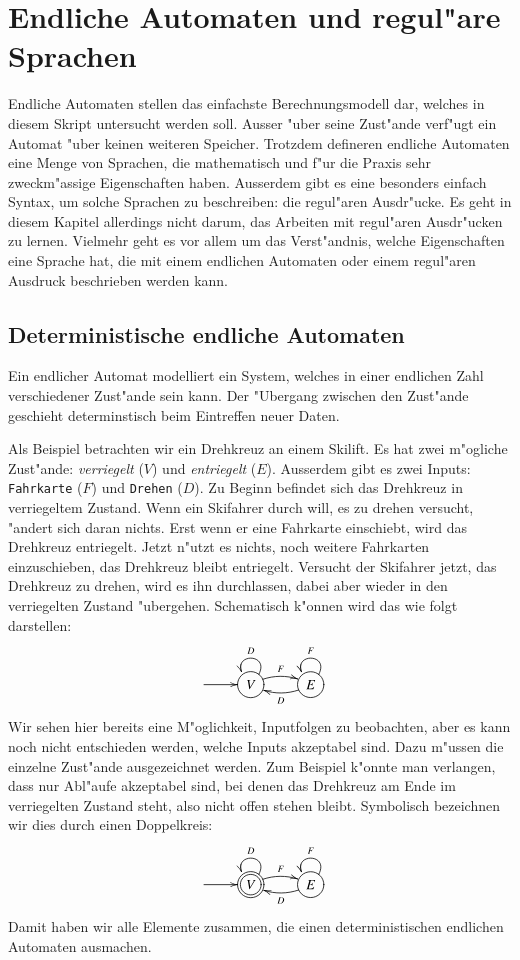 %
%
\chapter{Endliche Automaten und regul"are Sprachen\label{chapter-regular}}
Endliche Automaten stellen das einfachste Berechnungsmodell
dar, welches in diesem Skript untersucht werden soll. Ausser 
"uber seine Zust"ande verf"ugt ein Automat "uber keinen weiteren
Speicher.
Trotzdem defineren endliche Automaten eine Menge von Sprachen, die 
mathematisch und f"ur die Praxis sehr zweckm"assige Eigenschaften
haben.
Ausserdem gibt es eine besonders einfach Syntax, um
solche Sprachen zu beschreiben: die regul"aren Ausdr"ucke.
Es geht in diesem Kapitel allerdings nicht darum, das Arbeiten
mit regul"aren Ausdr"ucken zu lernen.
Vielmehr geht es vor allem um das Verst"andnis, welche Eigenschaften
eine Sprache hat, die mit einem endlichen Automaten oder einem
regul"aren Ausdruck beschrieben werden kann.

\section{Deterministische endliche Automaten}
Ein endlicher Automat modelliert ein System, welches
in einer endlichen Zahl verschiedener Zust"ande sein kann. Der
"Ubergang zwischen den Zust"ande geschieht determinstisch beim
Eintreffen neuer Daten.

Als Beispiel betrachten wir ein Drehkreuz an einem Skilift.
Es hat zwei m"ogliche Zust"ande: {\it  verriegelt} ($V$)
und  {\it entriegelt} ($E$).
Ausserdem gibt es zwei Inputs: {\tt Fahrkarte} ($F$)
und {\tt Drehen} ($D$). Zu Beginn befindet sich das Drehkreuz
in verriegeltem Zustand. Wenn ein Skifahrer durch will, es zu drehen
versucht, "andert sich daran nichts. Erst wenn er eine Fahrkarte einschiebt,
wird das Drehkreuz entriegelt. Jetzt n"utzt es nichts, noch weitere
Fahrkarten einzuschieben, das Drehkreuz bleibt entriegelt.
Versucht der Skifahrer jetzt, das Drehkreuz zu drehen, wird es
ihn durchlassen, dabei aber wieder in den verriegelten Zustand "ubergehen.
Schematisch k"onnen wird das wie folgt darstellen:
\[
\entrymodifiers={++[o][F]}
\xymatrix{
*+\txt{} \ar[r]
	&{V}\ar@/^/[r]^{F} \ar@(ur,ul)_{D}
		&{E}\ar@/^/[l]^{D} \ar@(ur,ul)_{F}
}
\]
Wir sehen hier bereits eine M"oglichkeit, Inputfolgen zu beobachten, 
aber es kann noch nicht entschieden werden, welche Inputs akzeptabel
sind. Dazu m"ussen die einzelne Zust"ande ausgezeichnet werden.
Zum Beispiel k"onnte man verlangen, dass nur Abl"aufe akzeptabel
sind, bei denen das Drehkreuz am Ende im verriegelten Zustand steht,
also nicht offen stehen bleibt. Symbolisch bezeichnen wir dies durch
einen Doppelkreis:
\[
\entrymodifiers={++[o][F]}
\xymatrix{
*+\txt{} \ar[r]
	&*++[o][F=]{V}\ar@/^/[r]^{F} \ar@(ur,ul)_{D}
		&{E}\ar@/^/[l]^{D} \ar@(ur,ul)_{F}
}
\]
Damit haben wir alle Elemente zusammen, die einen deterministischen
endlichen Automaten ausmachen.
